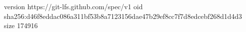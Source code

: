 version https://git-lfs.github.com/spec/v1
oid sha256:d46f8eddac086a311bf53b8a7123156dae47b29ef8cc7f7d8edcebf268d1d4d3
size 174916
